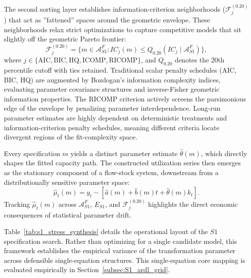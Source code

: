 \documentclass[11pt]{article}
\begin{document}
The second sorting layer establishes information-criterion neighborhoods ($\mathcal{F}^{(0.20)}_j$) that act as ''fattened'' spaces around the geometric envelope. These neighborhoods relax strict optimizations to capture competitive models that sit slightly off the geometric Pareto frontier:
\begin{equation}
\mathcal{F}^{(0.20)}_j = \{ m \in \mathcal{A}^{F}_{S1} : IC_j(m) \leq Q_{0.20}(IC_j \mid \mathcal{A}^{F}_{S1}) \},
\label{eq:F_j}
\end{equation}
where $j \in \{\text{AIC}, \text{BIC}, \text{HQ}, \text{ICOMP}, \text{RICOMP}\}$, and $Q_{0.20}$ denotes the 20th percentile cutoff with ties retained. Traditional scalar penalty schedules (AIC, BIC, HQ) are augmented by Bozdogan's information complexity indices, evaluating parameter covariance structures and inverse-Fisher geometric information properties. The RICOMP criterion actively screens the parsimonious edge of the envelope by penalizing parameter interdependence. Long-run parameter estimates are highly dependent on deterministic treatments and information-criterion penalty schedules, meaning different criteria locate divergent regions of the fit-complexity space.

Every specification $m$ yields a distinct parameter estimate $\hat{\theta}(m)$, which directly shapes the fitted capacity path. The constructed utilization series then emerges as the stationary component of a flow-stock system, downstream from a distributionally sensitive parameter space:
\begin{equation}
\hat{\mu}_t(m) = y_t - [\hat{a}(m) + \hat{b}(m)t + \hat{\theta}(m)k_t].
\label{eq:mu_hat_m}
\end{equation}
Tracking $\hat{\mu}_t(m)$ across $\mathcal{A}^{F}_{S1}$, $E_{S1}$, and $\mathcal{F}^{(0.20)}_j$ highlights the direct economic consequences of statistical parameter drift.

Table~\ref{tab:s1_stress_synthesis} details the operational layout of the $S1$ specification search. Rather than optimizing for a single candidate model, this framework establishes the empirical variance of the transformation parameter across defensible single-equation structures. This single-equation core mapping is evaluated empirically in Section~\ref{subsec:S1_ardl_grid}.
\end{document}
